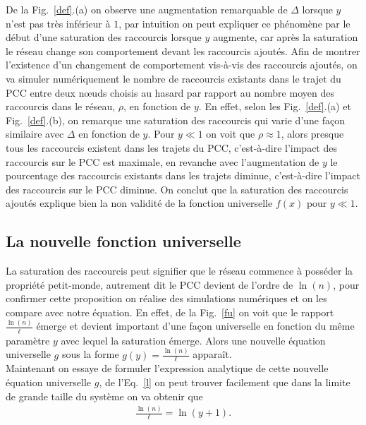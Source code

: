 De la Fig.~\ref{def}.(a) on observe une augmentation remarquable de $\Delta$ lorsque
$y$ n'est pas très inférieur à $1$, par intuition on peut expliquer ce phénomène par le début d'une saturation des raccourcis lorsque $y$ augmente, car après la saturation le réseau change son comportement devant les raccourcis ajoutés. Afin de montrer l'existence d'un changement de comportement vis-à-vis des raccourcis ajoutés, on va simuler numériquement le nombre de raccourcis existants dans le trajet du PCC entre deux nœuds choisis au hasard par rapport au nombre moyen des raccourcis dans le réseau, $\rho$, en fonction de $y$. En effet, selon les Fig.~\ref{def}.(a) et Fig.~\ref{def}.(b), on remarque une saturation des raccourcis qui varie d'une façon similaire avec $\Delta$ en fonction de $y$. Pour $y\ll1$ on voit que $\rho\approx1$, alors presque tous les raccourcis existent dans les trajets du PCC, c'est-à-dire l'impact des raccourcis sur le PCC est maximale, en revanche avec l'augmentation de $y$ le pourcentage des raccourcis existants dans les trajets diminue, c'est-à-dire l'impact des raccourcis sur le PCC diminue.
On conclut que la saturation des raccourcis ajoutés explique bien la non validité de la fonction universelle $f(x)$ pour  $y\ll1$.\\
 
\subsection{La nouvelle fonction universelle }
La saturation des raccourcis peut signifier que le réseau commence à posséder la propriété petit-monde,
autrement dit le PCC devient de l'ordre de $\ln(n)$, pour confirmer cette proposition on réalise des simulations numériques et on  les compare avec notre équation. En effet, de la Fig.~\ref{fu} on voit que le rapport
$\frac{\ln(n)}{\ell}$ émerge et devient important d'une façon universelle en fonction du même paramètre $y$ avec lequel la saturation émerge. Alors une nouvelle équation universelle $g$ sous la forme $g(y)=\frac{\ln(n)}{\ell}$ apparaît.\\

Maintenant on essaye de formuler l'expression analytique de cette nouvelle équation universelle $g$, de l'Eq.~\eqref{l} on peut trouver facilement que dans la limite de grande taille du système on va obtenir que
\begin{eqnarray}
\frac{\ln(n)}{\ell}=\ln(y+1).
\label{kp1}
\end{eqnarray}

